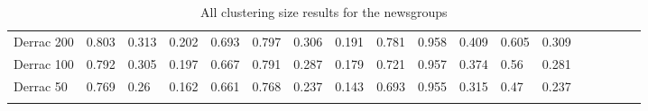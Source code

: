 {\begin{landscape}
\begin{table}[]
\begin{tabular}{lll@{\hskip 0.15in}lllllllllllllll}
		\midrule
		Derrac 200  & 0.803                           & 0.313                           & 0.202                           & 0.693                           & 0.797                           & 0.306                           & 0.191                          & 0.781                           & 0.958                           & 0.409                           & 0.605                           & 0.309                      \\
		Derrac 100  & 0.792                           & 0.305                           & 0.197                           & 0.667                           & 0.791                           & 0.287                           & 0.179                          & 0.721                           & 0.957                           & 0.374                           & 0.56                            & 0.281               \\
		Derrac 50   & 0.769                           & 0.26                            & 0.162                           & 0.661                           & 0.768                           & 0.237                           & 0.143                          & 0.693                           & 0.955                           & 0.315                           & 0.47                            & 0.237                                     \\
		&                                 &                                 &                                 &                                 &                                 &                                 &                                &                                 &                                 &                                 &                                 &                                                       \\
		
   
	\end{tabular}
\centering
	\caption{All clustering size results for the newsgroups}
\end{table}


\end{landscape}}
